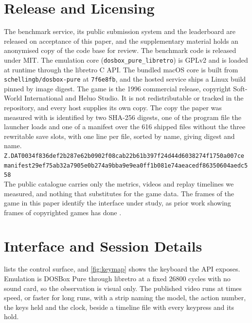 \documentclass{article} %
\begin{document}



\appendix
{}

\section{Release and Licensing}
\label{app:licence}
The benchmark service, its public submission system and the leaderboard are released on acceptance of this paper, and the supplementary material holds an anonymised copy of the code base for review. The benchmark code is released under MIT. The emulation core
(\texttt{dosbox\_pure\_libretro}) is GPLv2 and is loaded at runtime through the libretro C API. The bundled macOS core is built from \texttt{schellingb/dosbox-pure} at \texttt{7f6e8fb}, and the hosted
service ships a Linux build pinned by image digest. The game is the 1996
commercial release, copyright Soft-World International and
Heluo Studio. It is not redistributable or tracked in the repository, and every host supplies its own copy. The copy the paper was measured with is identified by two SHA-256 digests, one of the program file the launcher loads and one of a manifest over the 616 shipped files without the three rewritable save slots, with one line per file, sorted by name, giving digest and name.\\ \texttt{\footnotesize Z.DAT\quad 0034f836def2b287e62b0902f08cab22b61b397f24d44d6038274f1750a007ce}\\ \texttt{\footnotesize manifest\quad 29ef75ab32a7905e0b274a9bba9e9ea0ff1b081e74aeacedf86350604aedc558}\\ The public catalogue carries only the metrics, videos
and replay timelines we measured, and nothing that substitutes for the game
data. The frames of the game in this paper
identify the interface under study, as prior work showing frames of
copyrighted games has done \citep{paglieri2025balrog}.

\section{Interface and Session Details}
\label{app:infra}
 lists the control surface, and \cref{fig:keymap} shows the keyboard the API exposes. Emulation is DOSBox Pure through libretro at a fixed 26800 cycles with no sound card, so the observation is visual only. The published video runs at \DefaultReplaySpeed{} times speed, or faster for long runs, with a strip naming the model, the action number, the keys held and the clock, beside a timeline file with every keypress and its hold.
\end{document}
